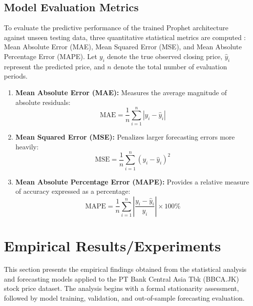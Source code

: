 \documentclass[11pt,twoside]{article}
\begin{document}
\subsection{Model Evaluation Metrics}
\label{SubSec:Evaluation}

To evaluate the predictive performance of the trained Prophet architecture against unseen testing data, three quantitative statistical metrics are computed \cite{Hyndman2006}: Mean Absolute Error (MAE), Mean Squared Error (MSE), and Mean Absolute Percentage Error (MAPE). Let $y_i$ denote the true observed closing price, $\hat{y}_i$ represent the predicted price, and $n$ denote the total number of evaluation periods.

\begin{enumerate}
    \item \textbf{Mean Absolute Error (MAE):} Measures the average magnitude of absolute residuals:
    \begin{equation}
    \text{MAE} = \frac{1}{n} \sum_{i=1}^{n} |y_i - \hat{y}_i|
    \end{equation}
    \item \textbf{Mean Squared Error (MSE):} Penalizes larger forecasting errors more heavily:
    \begin{equation}
    \text{MSE} = \frac{1}{n} \sum_{i=1}^{n} (y_i - \hat{y}_i)^2
    \end{equation}
    \item \textbf{Mean Absolute Percentage Error (MAPE):} Provides a relative measure of accuracy expressed as a percentage:
    \begin{equation}
    \text{MAPE} = \frac{1}{n} \sum_{i=1}^{n} \left| \frac{y_i - \hat{y}_i}{y_i} \right| \times 100\%
    \end{equation}
\end{enumerate}

\section{Empirical Results/Experiments}
\label{Sec:Results}

This section presents the empirical findings obtained from the statistical analysis and forecasting models applied to the PT Bank Central Asia Tbk (BBCA.JK) stock price dataset. The analysis begins with a formal stationarity assessment, followed by model training, validation, and out-of-sample forecasting evaluation.
\end{document}
